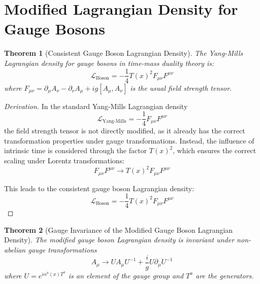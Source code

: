 \documentclass{article}
\newtheorem{theorem}{Theorem}[section]
\theoremstyle{definition}
\theoremstyle{remark}
\newcommand{\Tfield}{T(x)} %
\begin{document}
	\section{Modified Lagrangian Density for Gauge Bosons}
	
	\begin{theorem}[Consistent Gauge Boson Lagrangian Density]
		The Yang-Mills Lagrangian density for gauge bosons in time-mass duality theory is:
		\begin{equation}
			\mathcal{L}_{\text{Boson}} = -\frac{1}{4} \Tfield^2 F_{\mu\nu}F^{\mu\nu}
		\end{equation}
		where $F_{\mu\nu} = \partial_\mu A_\nu - \partial_\nu A_\mu + ig[A_\mu, A_\nu]$ is the usual field strength tensor.
	\end{theorem}
	
	\begin{proof}[Derivation]
		In the standard Yang-Mills Lagrangian density
		\begin{equation}
			\mathcal{L}_{\text{Yang-Mills}} = -\frac{1}{4}F_{\mu\nu}F^{\mu\nu}
		\end{equation}
		the field strength tensor is not directly modified, as it already has the correct transformation properties under gauge transformations. Instead, the influence of intrinsic time is considered through the factor $\Tfield^2$, which ensures the correct scaling under Lorentz transformations:
		\begin{equation}
			F_{\mu\nu}F^{\mu\nu} \rightarrow \Tfield^2 F_{\mu\nu}F^{\mu\nu}
		\end{equation}
		
		This leads to the consistent gauge boson Lagrangian density:
		\begin{equation}
			\mathcal{L}_{\text{Boson}} = -\frac{1}{4} \Tfield^2 F_{\mu\nu}F^{\mu\nu}
		\end{equation}
	\end{proof}
	
	\begin{theorem}[Gauge Invariance of the Modified Gauge Boson Lagrangian Density]
		The modified gauge boson Lagrangian density is invariant under non-abelian gauge transformations
		\begin{equation}
			A_\mu \rightarrow U A_\mu U^{-1} + \frac{i}{g}U\partial_\mu U^{-1}
		\end{equation}
		where $U = e^{i\alpha^a(x)T^a}$ is an element of the gauge group and $T^a$ are the generators.
	\end{theorem}
	
\end{document}
